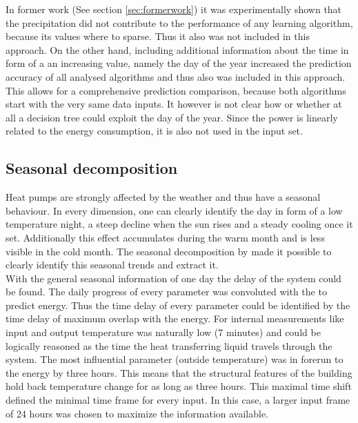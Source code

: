 \documentclass[conference]{IEEEtran}
\begin{document}
In former work (See section \ref{sec:formerwork}) it was experimentally shown that the precipitation did not contribute to the performance of any learning algorithm, because its values where to sparse. Thus it also was not included in this approach.
On the other hand, including additional information about the time in form of a an increasing value, namely the day of the year increased the prediction accuracy of all analysed algorithms and thus also was included in this approach. This allows for a comprehensive prediction comparison, because both algorithms start with the very same data inputs. It however is not clear how or whether at all a decision tree could exploit the day of the year. Since the power is linearly related to the energy consumption, it is also not used in the input set.


\subsection{Seasonal decomposition}
Heat pumps are strongly affected by the weather and thus have a seasonal behaviour. In every dimension, one can clearly identify the day in form of a low temperature night, a steep decline when the sun rises and a steady cooling once it set. Additionally this effect accumulates during the warm month and is less visible in the cold month. The seasonal decomposition by \cite{loess} made it possible to clearly identify this seasonal trends and extract it.\\
With the general seasonal information of one day the delay of the system could be found. The daily progress of every parameter was convoluted with the to predict energy. Thus the time delay of every parameter could be identified by the time delay of maximum overlap with the energy. For internal measurements like input and output temperature was naturally low (7 minutes) and could be logically reasoned as the time the heat transferring liquid travels through the system. The most influential parameter (outside temperature) was in forerun to the energy by three hours. This means that the structural features of the building hold back temperature change for as long as three hours. This maximal time shift defined the minimal time frame for every input. In this case, a larger input frame of 24 hours was chosen to maximize the information available.
\end{document}
